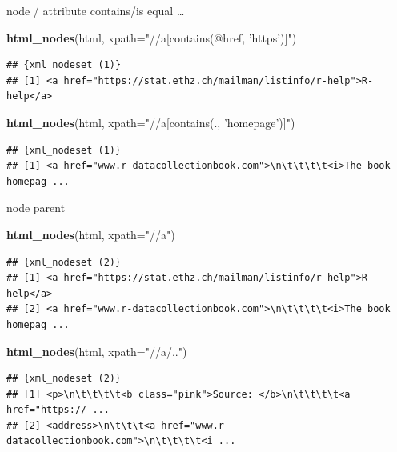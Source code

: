 \documentclass[ignorenonframetext,]{beamer}
\newenvironment{Shaded}{\begin{snugshade}}{\end{snugshade}}
\newcommand{\KeywordTok}[1]{\textcolor[rgb]{0.13,0.29,0.53}{\textbf{{#1}}}}
\newcommand{\DataTypeTok}[1]{\textcolor[rgb]{0.13,0.29,0.53}{{#1}}}
\newcommand{\StringTok}[1]{\textcolor[rgb]{0.31,0.60,0.02}{{#1}}}
\newcommand{\NormalTok}[1]{{#1}}
\begin{document}
\begin{frame}[fragile]{node / attribute contains/is equal \ldots{}}

\begin{Shaded}
\begin{Highlighting}[]
\KeywordTok{html_nodes}\NormalTok{(html, }\DataTypeTok{xpath=}\StringTok{"//a[contains(@href, 'https')]"}\NormalTok{)}
\end{Highlighting}
\end{Shaded}

\begin{verbatim}
## {xml_nodeset (1)}
## [1] <a href="https://stat.ethz.ch/mailman/listinfo/r-help">R-help</a>
\end{verbatim}

\begin{Shaded}
\begin{Highlighting}[]
\KeywordTok{html_nodes}\NormalTok{(html, }\DataTypeTok{xpath=}\StringTok{"//a[contains(., 'homepage')]"}\NormalTok{)}
\end{Highlighting}
\end{Shaded}

\begin{verbatim}
## {xml_nodeset (1)}
## [1] <a href="www.r-datacollectionbook.com">\n\t\t\t\t<i>The book homepag ...
\end{verbatim}

\end{frame}

\begin{frame}[fragile]{node parent}

\begin{Shaded}
\begin{Highlighting}[]
\KeywordTok{html_nodes}\NormalTok{(html, }\DataTypeTok{xpath=}\StringTok{"//a"}\NormalTok{)}
\end{Highlighting}
\end{Shaded}

\begin{verbatim}
## {xml_nodeset (2)}
## [1] <a href="https://stat.ethz.ch/mailman/listinfo/r-help">R-help</a>
## [2] <a href="www.r-datacollectionbook.com">\n\t\t\t\t<i>The book homepag ...
\end{verbatim}

\begin{Shaded}
\begin{Highlighting}[]
\KeywordTok{html_nodes}\NormalTok{(html, }\DataTypeTok{xpath=}\StringTok{"//a/.."}\NormalTok{)}
\end{Highlighting}
\end{Shaded}

\begin{verbatim}
## {xml_nodeset (2)}
## [1] <p>\n\t\t\t\t<b class="pink">Source: </b>\n\t\t\t\t<a href="https:// ...
## [2] <address>\n\t\t\t<a href="www.r-datacollectionbook.com">\n\t\t\t\t<i ...
\end{verbatim}

\end{frame}
\end{document}
